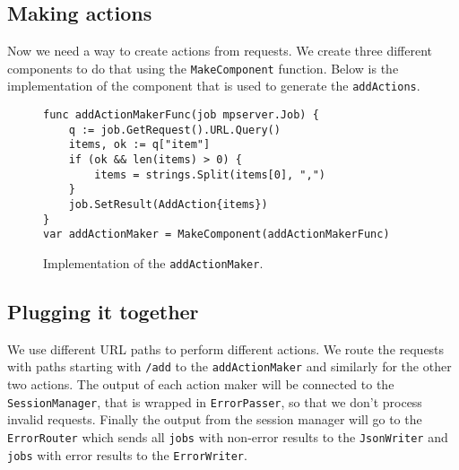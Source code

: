 \subsection{Making actions}
Now we need a way to create actions from requests. We create three different
components to do that using the \texttt{MakeComponent} function. Below
is the implementation of the component that is used to generate 
the \texttt{addActions}.
\begin{figure}[h]
\begin{lstlisting}
func addActionMakerFunc(job mpserver.Job) {
    q := job.GetRequest().URL.Query()
    items, ok := q["item"]
    if (ok && len(items) > 0) {
        items = strings.Split(items[0], ",")
    }
    job.SetResult(AddAction{items})
}
var addActionMaker = MakeComponent(addActionMakerFunc) 
\end{lstlisting}
\caption[scale=1.0]{Implementation of the \texttt{addActionMaker}.}
\label{fig:addActionMaker}
\end{figure}

\subsection{Plugging it together}
We use different URL paths to perform different actions. We route the 
requests with paths starting with \texttt{/add} to the \texttt{addActionMaker}
and similarly for the other two actions. The output of each action maker
will be connected to the \texttt{SessionManager}, that is wrapped in
\texttt{ErrorPasser}, so that we don't process invalid requests.
Finally the output from the session manager will go to the \texttt{ErrorRouter}
which sends all \texttt{jobs} with non-error results to the 
\texttt{JsonWriter} and \texttt{jobs} with error results to the 
\texttt{ErrorWriter}. 

